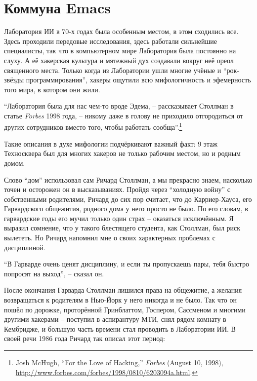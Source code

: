 
\chapter{Коммуна Emacs}

Лаборатория ИИ в 70-х годах была особенным местом, в этом сходились все. Здесь проходили передовые исследования, здесь работали сильнейшие специалисты, так что в компьютерном мире Лаборатория была постоянно на слуху. А её хакерская культура и мятежный дух создавали вокруг неё ореол священного места. Только когда из Лаборатории ушли многие учёные и \enquote{рок-звёзды программирования}, хакеры ощутили всю мифологичность и эфемерность того мира, в котором они жили.

\enquote{Лаборатория была для нас чем-то вроде Эдема, -- рассказывает Столлман в статье \textit{Forbes} 1998 года, -- никому даже в голову не приходило отгородиться от других сотрудников вместо того, чтобы работать сообща}.\footnote{Josh McHugh, \enquote{For the Love of Hacking,} \textit{Forbes} (August 10, 1998), \url{http://www.forbes.com/forbes/1998/0810/6203094a.html}.}

Такие описания в духе мифологии подчёркивают важный факт: 9 этаж Техносквера был для многих хакеров не только рабочим местом, но и родным домом.

Слово \enquote{дом} использовал сам Ричард Столлман, а мы прекрасно знаем, насколько точен и осторожен он в высказываниях. Пройдя через \enquote{холодную войну} с собственными родителями, Ричард до сих пор считает, что до Карриер-Хауса, его Гарвардского общежития, родного дома у него просто не было. По его словам, в гарвардские годы его мучил только один страх -- оказаться исключённым. Я выразил сомнение, что у такого блестящего студента, как Столлман, был риск вылететь. Но Ричард напомнил мне о своих характерных проблемах с дисциплиной.

\enquote{В Гарварде очень ценят дисциплину, и если ты пропускаешь пары, тебя быстро попросят на выход}, -- сказал он.

После окончания Гарварда Столлман лишился права на общежитие, а желания возвращаться к родителям в Нью-Йорк у него никогда и не было. Так что он пошёл по дорожке, проторённой Гринблаттом, Госпером, Сассменом и многими другими хакерами -- поступил в аспирантуру МТИ, снял рядом комнату в Кембридже, и большую часть времени стал проводить в Лаборатории ИИ. В своей речи 1986 года Ричард так описал этот период:

